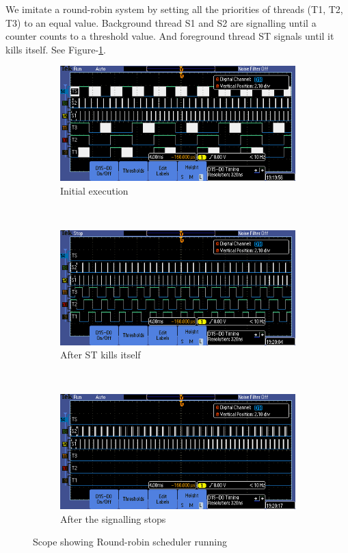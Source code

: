\documentclass[a4paper]{article}
\newlength{\pic}
\begin{document}
We imitate a round-robin system by setting all the priorities of threads (T1, T2, T3) to an equal value.
Background thread S1 and S2 are signalling until a counter counts to a threshold value. And foreground
thread ST signals until it kills itself. See Figure-\ref{RR}.

\setlength{\pic}{0.8\textwidth}

\begin{figure}[htp]
\center
	\begin{subfigure}[H]{\pic}
	\includegraphics[width=\pic]{Scope/RR_a}
	\caption{Initial execution}
	\end{subfigure}
	\\[5pt]
	\begin{subfigure}[H]{\pic}
	\includegraphics[width=\pic]{Scope/RR_b}
	\caption{After ST kills itself}
	\end{subfigure}
	\\[5pt]
	\begin{subfigure}[H]{\pic}
	\includegraphics[width=\pic]{Scope/RR_c}
	\caption{After the signalling stops}
	\end{subfigure}
	
\caption{Scope showing Round-robin scheduler running}
\label{RR}
\end{figure}
\end{document}
